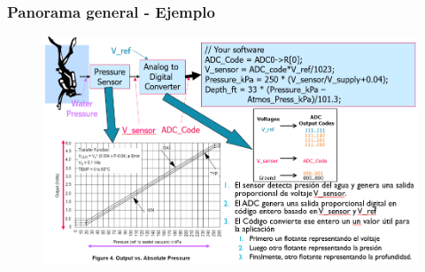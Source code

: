 \documentclass[10.5pt,scale=1.0,t,aspectratio=169,hyperref={pdfpagelabels=false}]{beamer}
\begin{document}
\begin{frame}
	\frametitle{Panorama general - Ejemplo}
	\begin{figure}
		\centering\includegraphics[scale=0.45]{fig_BigPicture}
	\end{figure}
\end{frame}
\end{document}
